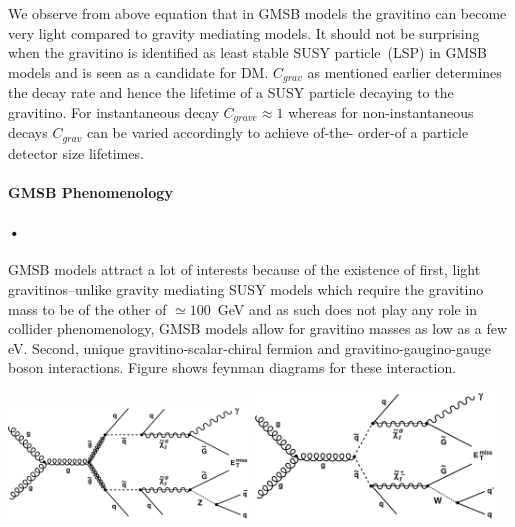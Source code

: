 {We observe from above equation that in GMSB models the gravitino can become very light compared to gravity mediating models. It should not be surprising when the gravitino is identified as least stable SUSY particle~(LSP) in GMSB models and is seen as a candidate for DM. $C_{grav}$ as mentioned earlier determines the decay rate and hence the lifetime of a SUSY particle decaying to the gravitino. For instantaneous decay $C_{grave} \approx 1$ whereas for non-instantaneous decays $C_{grav}$ can be varied accordingly to achieve of-the- order-of a particle detector size lifetimes.
\paragraph{GMSB Phenomenology}
\paragraph*{•}
GMSB models attract a lot of interests  because of the existence of first, light gravitinos--unlike gravity mediating SUSY models which require the gravitino mass to be of the other of $\simeq 100$~GeV and as such does not play any role in collider phenomenology, GMSB models allow for gravitino masses as low as a few eV.
Second, unique gravitino-scalar-chiral fermion and gravitino-gaugino-gauge boson interactions. Figure\label{gravitino} shows feynman diagrams for these interaction.

\begin{center}
\centering
\mbox{\includegraphics[width=2.5in]{THESISPLOTS/SinglePhoton_gluino.pdf} \quad \quad
\includegraphics[width=2.5in]{THESISPLOTS/SinglePhoton_squark.pdf}}
\label{fig:feynman_grav}
\end{center}

}
